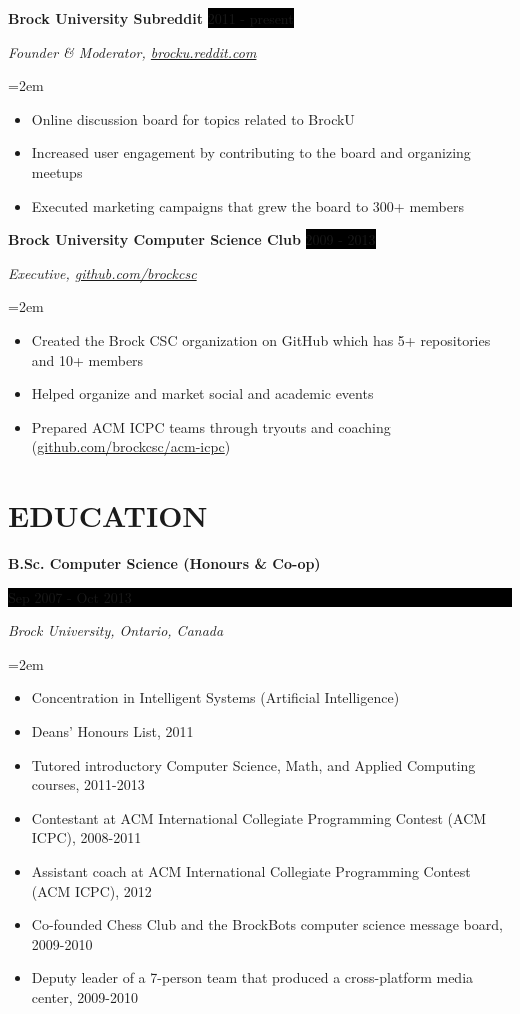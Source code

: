 \documentclass[paper=a4,fontsize=11pt]{scrartcl} %
\newcommand{\sepspace}{\vspace*{1em}}     %
\newcommand{\NewPart}[1]{\section*{\uppercase{#1}}}
\newcommand{\EducationEntry}[4]{
    \noindent \textbf{#1} \hfill        %
    \colorbox{Black}{
      \parbox{8.5em}{
      \hfill\color{White}#2}} \par      %
    \noindent \textit{#3} \par          %
    \noindent\hangindent=2em\hangafter=0 \small #4 %
    \normalsize \par}
\newcommand{\OrganizationEntry}[4]{         %
    \noindent \textbf{#1} \hfill            %
    \colorbox{Black}{\color{White}#2} \par  %
    \noindent \textit{#3} \par              %
    \noindent\hangindent=2em\hangafter=0 \small #4 %
    \normalsize \par}
\begin{document}
\OrganizationEntry{Brock University Subreddit}{2011 - present}
{Founder \& Moderator, \url{brocku.reddit.com}}
{
 \begin{itemize} \itemsep -1pt
   \item Online discussion board for topics related to BrockU
   \item Increased user engagement by contributing to the board and organizing meetups
   \item Executed marketing campaigns that grew the board to 300+ members
 \end{itemize}
}
\sepspace

\OrganizationEntry{Brock University Computer Science Club}{2009 - 2013}
{Executive, \url{github.com/brockcsc}}
{
 \begin{itemize} \itemsep -1pt
   \item Created the Brock CSC organization on GitHub which has 5+ repositories and 10+ members
   \item Helped organize and market social and academic events
   \item Prepared ACM ICPC teams through tryouts and coaching (\url{github.com/brockcsc/acm-icpc})
 \end{itemize}
}

\NewPart{Education}{}

\EducationEntry{B.Sc. Computer Science (Honours \& Co-op)}
{Sep 2007 - Oct 2013}
{Brock University, Ontario, Canada}
{
\begin{itemize}  \itemsep -1pt
  \item Concentration in Intelligent Systems (Artificial Intelligence)
  \item Deans' Honours List, 2011
  \item Tutored introductory Computer Science, Math, and Applied Computing courses, 2011-2013
  \item Contestant at ACM International Collegiate Programming Contest (ACM ICPC), 2008-2011
  \item Assistant coach at ACM International Collegiate Programming Contest (ACM ICPC), 2012
  \item Co-founded Chess Club and the BrockBots computer science
  message board, 2009-2010
  \item Deputy leader of a 7-person team that produced a cross-platform media center, 2009-2010
\end{itemize}
}
\end{document}
